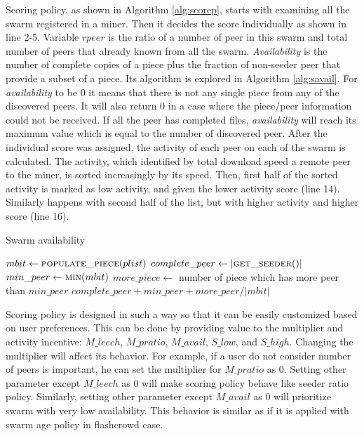 Scoring policy, as shown in Algorithm \ref{alg:scorep}, starts with examining all the swarm registered in a miner. Then it decides the score individually as shown in line 2-5. Variable $rpeer$ is the ratio of a number of peer in this swarm and total number of peers that already known from all the swarm. \textit{Availability} is the number of complete copies of a piece plus the fraction of non-seeder peer that provide a subset of a piece. Its algorithm is explored in Algorithm \ref{alg:savail}. For \textit{availability} to be 0 it means that there is not any single piece from any of the discovered peers. It will also return 0 in a case where the piece/peer information could not be received. If all the peer has completed files, \textit{availability} will reach its maximum value which is equal to the number of discovered peer. After the individual score was assigned, the activity of each peer on each of the swarm is calculated. The activity, which identified by total download speed a remote peer to the miner, is sorted increasingly by its speed. Then, first half of the sorted activity is marked as low activity, and given the lower activity score (line 14). Similarly happens with second half of the list, but with higher activity and higher score (line 16).

\begin{algorithm}[h]
	\caption{Swarm availability}
	\label{alg:savail}
	\begin{algorithmic}[1]
		\State $mbit \gets \Call{populate\_piece}{plist}$
		\State $complete\_peer \gets |\Call{get\_seeder}{\null}|$ 
		\State $min\_peer \gets \Call{min}{mbit}$
		\State $more\_piece \gets $ number of piece which has more peer than $min\_peer$
		\State \Return $complete\_peer + min\_peer + more\_peer/|mbit|$
	\end{algorithmic}
\end{algorithm}

Scoring policy is designed in such a way so that it can be easily customized based on user preferences. This can be done by providing value to the multiplier and activity incentive: $M\_leech$, $M\_pratio$, $M\_avail$, $S\_low$, and $S\_high$. Changing the multiplier will affect its behavior. For example, if a user do not consider number of peers is important, he can set the multiplier for $M\_pratio$ as 0. Setting other parameter except $M\_leech$ as 0 will make scoring policy behave like seeder ratio policy. Similarly, setting other parameter except $M\_avail$ as 0 will prioritize swarm with very low availability. This behavior is similar as if it is applied with swarm age policy in flashcrowd case.

